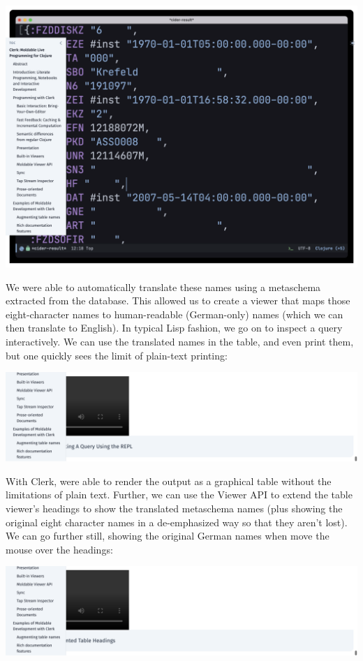 \documentclass[sigconf,screen]{acmart}
\begin{document}
\includegraphics{images/result-anon-expr-5dsGLp7Mm1EDixYxw4xmuQn4H9BcGE.png}

We were able to automatically translate these names using a metaschema extracted from the database. This allowed us to create a viewer that maps those eight-character names to human-readable (German-only) names (which we can then translate to English). In typical Lisp fashion, we go on to inspect a query interactively. We can use the translated names in the table, and even print them, but one quickly sees the limit of plain-text printing:

\includegraphics{images/result-anon-expr-5dthp9EcmUsX7frFtqmvmb89kLH1WT.png}

With Clerk, were able to render the output as a graphical table without the limitations of plain text. Further, we can use the Viewer API to extend the table viewer's headings to show the translated metaschema names (plus showing the original eight character names in a de-emphasized way so that they aren't lost). We can go further still, showing the original German names when move the mouse over the headings:

\includegraphics{images/result-anon-expr-5dtD2VriNBKFKiVaEUxFQvHjeWuH3C.png}
\end{document}
